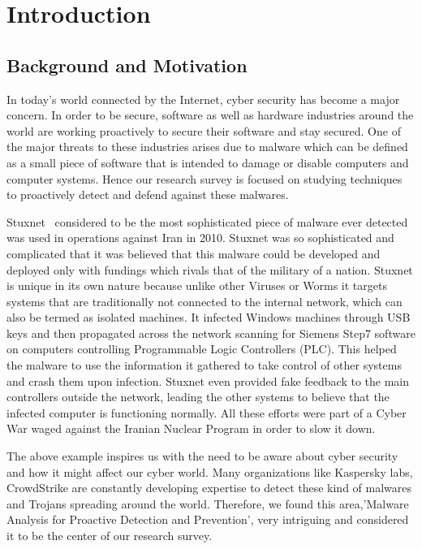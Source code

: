 \documentclass[11pt]{article}
\begin{document}
	\newpage
	\tableofcontents
	\newpage
	\listoftables
	\newpage
	\listoffigures
	\newpage
	\section{Introduction}
	\subsection{Background and Motivation}
	In today’s world connected by the Internet, cyber security has become a major concern. In order
to be secure, software as well as hardware industries around the world are working proactively to
secure their software and stay secured. One of the major threats to these industries arises due to
malware which can be defined as a small piece of software that is intended to damage or disable
computers and computer systems. Hence our research survey is focused on studying techniques
to proactively detect and defend against these malwares.

Stuxnet~\cite{creators2013kill, stuxnet} considered to be the most sophisticated piece of malware ever detected was used in operations against Iran in 2010. Stuxnet was so sophisticated and complicated that it was believed that this malware could be developed and deployed only with fundings which rivals that of the military of a nation. Stuxnet is unique in its own nature because unlike other Viruses or Worms it targets systems that are traditionally not connected to the internal network, which can also be termed as isolated machines. It infected Windows machines through USB keys and then propagated across the network scanning for Siemens Step7 software on computers controlling Programmable Logic Controllers (PLC). This helped the malware to use the information it gathered to take control of other systems and crash them upon infection. Stuxnet even provided fake feedback to the main controllers outside the network, leading the other systems to believe that the infected computer is functioning normally. All these efforts were part of a Cyber War waged against the Iranian Nuclear Program in order to slow it down.

The above example inspires us with the need to be aware about cyber security and how it might affect our cyber world. Many organizations like Kaspersky labs, CrowdStrike are constantly developing expertise to detect these kind of malwares and Trojans spreading around the world. Therefore, we found this area,'Malware Analysis for Proactive Detection and Prevention', very intriguing and considered it to be the center of our research survey.
\end{document}

